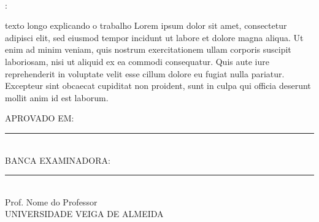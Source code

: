 \begin{center}

    \thispagestyle{pretext}
    
    \ \\ 
    \printAuthors

    \vfill

    \uppercase\expandafter{\TitleName}: \\
    \uppercase\expandafter{\SubtitleName}

    \vfill


    \begin{adjustwidth}{7.5cm}{}
        \noindent texto longo explicando o trabalho Lorem ipsum dolor sit amet, consectetur adipisci elit, sed eiusmod tempor incidunt ut labore et dolore magna aliqua. Ut enim ad minim veniam, quis nostrum exercitationem ullam corporis suscipit laboriosam, nisi ut aliquid ex ea commodi consequatur. Quis aute iure reprehenderit in voluptate velit esse cillum dolore eu fugiat nulla pariatur. Excepteur sint obcaecat cupiditat non proident, sunt in culpa qui officia deserunt mollit anim id est laborum.
    \end{adjustwidth}

    \vfill

    APROVADO EM:\\[0.5cm]
    \rule{0.6\textwidth}{0.4pt} \\[1.5cm]

    \uppercase{%
        Banca Examinadora:%
    } \\[0.5 cm]
    
    \rule{0.6\textwidth}{0.4pt} \\
    Prof. Nome do Professor \\
    UNIVERSIDADE VEIGA DE ALMEIDA
    
\end{center}

\newpage